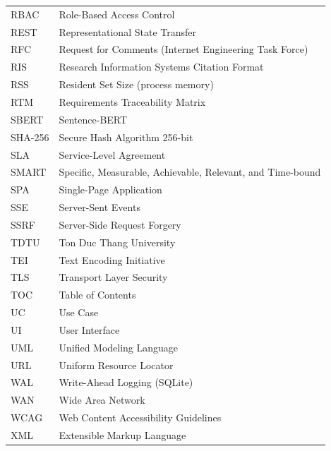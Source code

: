 {\begin{longtable}{P{0.22}P{0.78}}
RBAC & Role-Based Access Control \\
REST & Representational State Transfer \\
RFC & Request for Comments (Internet Engineering Task Force) \\
RIS & Research Information Systems Citation Format \\
RSS & Resident Set Size (process memory) \\
RTM & Requirements Traceability Matrix \\
SBERT & Sentence-BERT \\
SHA-256 & Secure Hash Algorithm 256-bit \\
SLA & Service-Level Agreement \\
SMART & Specific, Measurable, Achievable, Relevant, and Time-bound \\
SPA & Single-Page Application \\
SSE & Server-Sent Events \\
SSRF & Server-Side Request Forgery \\
TDTU & Ton Duc Thang University \\
TEI & Text Encoding Initiative \\
TLS & Transport Layer Security \\
TOC & Table of Contents \\
UC & Use Case \\
UI & User Interface \\
UML & Unified Modeling Language \\
URL & Uniform Resource Locator \\
WAL & Write-Ahead Logging (SQLite) \\
WAN & Wide Area Network \\
WCAG & Web Content Accessibility Guidelines \\
XML & Extensible Markup Language \\
\end{longtable}}

\newpage
{}
\pagestyle{fancy}
